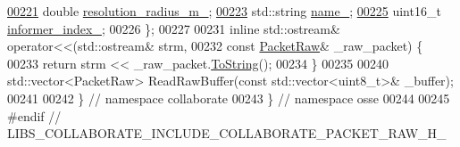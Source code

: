 \begin{DoxyCode}
\hyperlink{classosse_1_1collaborate_1_1_packet_raw_ab2b10a2c86557025014f3d342ceadeae}{00221}   \textcolor{keywordtype}{double} \hyperlink{classosse_1_1collaborate_1_1_packet_raw_ab2b10a2c86557025014f3d342ceadeae}{resolution\_radius\_m\_};
\hyperlink{classosse_1_1collaborate_1_1_packet_raw_a814de948d41567761f87343d28984843}{00223}   std::string \hyperlink{classosse_1_1collaborate_1_1_packet_raw_a814de948d41567761f87343d28984843}{name\_};
\hyperlink{classosse_1_1collaborate_1_1_packet_raw_af7a667ad506f25e2050ffb1d862efbd9}{00225}   uint16\_t \hyperlink{classosse_1_1collaborate_1_1_packet_raw_af7a667ad506f25e2050ffb1d862efbd9}{informer\_index\_};
00226 \};
00227 
00231 \textcolor{keyword}{inline} std::ostream& operator<<(std::ostream& strm,
00232                                 \textcolor{keyword}{const} \hyperlink{classosse_1_1collaborate_1_1_packet_raw}{PacketRaw}& \_raw\_packet) \{
00233   \textcolor{keywordflow}{return} strm << \_raw\_packet.\hyperlink{classosse_1_1collaborate_1_1_packet_raw_a838d1364ab1defdff4abcabf5369827a}{ToString}();
00234 \}
00235 
00240 std::vector<PacketRaw> ReadRawBuffer(\textcolor{keyword}{const} std::vector<uint8\_t>& \_buffer);
00241 
00242 \}  \textcolor{comment}{// namespace collaborate}
00243 \}  \textcolor{comment}{// namespace osse}
00244 
00245 \textcolor{preprocessor}{#endif  // LIBS\_COLLABORATE\_INCLUDE\_COLLABORATE\_PACKET\_RAW\_H\_}
\end{DoxyCode}
